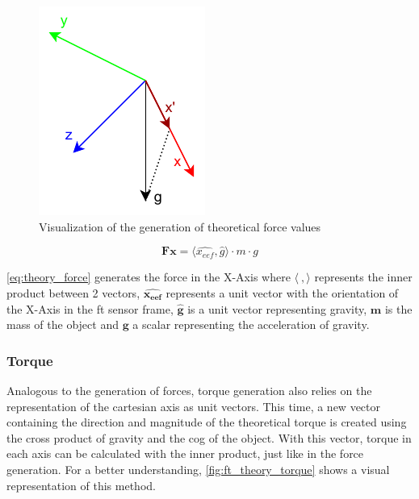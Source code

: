 \begin{figure}[h]
    \centering
    \includegraphics[width=0.3\linewidth]{figs/chp3/ft_theory_force.pdf}
    \caption{Visualization of the generation of theoretical force values}
    \label{fig:ft_theory_force}
\end{figure}

\begin{figure}[h]
    \begin{equation}
        \mathbf{Fx} = \langle \hat{x_{eef}} , \hat{g} \rangle \cdot m \cdot g
        \label{eq:theory_force}
    \end{equation}
\end{figure}

\par \autoref{eq:theory_force} generates the force in the X-Axis where $\mathbf{\langle \:, \rangle}$ represents the inner product between 2 vectors, $\mathbf{\hat{x_{eef}}}$ represents a unit vector with the orientation of the X-Axis in the \ac{ft} sensor frame, $\mathbf{\hat{g}}$ is a unit vector representing gravity, $\mathbf{m}$ is the mass of the object and $\mathbf{g}$ a scalar representing the acceleration of gravity.

\subsubsection{Torque}

\par Analogous to the generation of forces, torque generation also relies on the representation of the cartesian axis as unit vectors. This time, a new vector containing the direction and magnitude of the theoretical torque is created using the cross product of gravity and the \ac{cog} of the object. With this vector, torque in each axis can be calculated with the inner product, just like in the force generation. For a better understanding, \autoref{fig:ft_theory_torque} shows a visual representation of this method.

